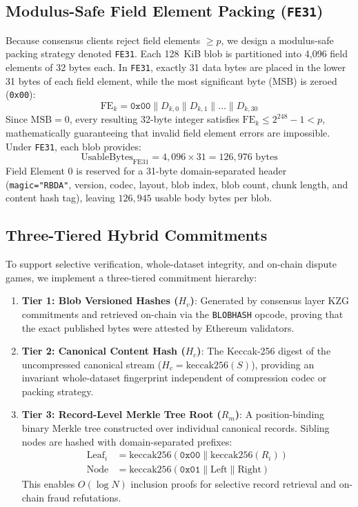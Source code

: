 \subsection{Modulus-Safe Field Element Packing (\texttt{FE31})}
Because consensus clients reject field elements $\ge p$, we design a modulus-safe packing strategy denoted \texttt{FE31}. Each 128~KiB blob is partitioned into 4,096 field elements of 32 bytes each. In \texttt{FE31}, exactly 31 data bytes are placed in the lower 31 bytes of each field element, while the most significant byte (MSB) is zeroed (\texttt{0x00}):
\begin{equation}
\text{FE}_k = \texttt{0x00} \parallel D_{k,0} \parallel D_{k,1} \parallel \dots \parallel D_{k,30}
\end{equation}
Since $\text{MSB} = 0$, every resulting 32-byte integer satisfies $\text{FE}_k \le 2^{248} - 1 < p$, mathematically guaranteeing that invalid field element errors are impossible. Under \texttt{FE31}, each blob provides:
\begin{equation}
\text{UsableBytes}_{\text{FE31}} = 4,096 \times 31 = 126,976 \text{ bytes}
\end{equation}
Field Element 0 is reserved for a 31-byte domain-separated header (\texttt{magic="RBDA"}, version, codec, layout, blob index, blob count, chunk length, and content hash tag), leaving $126,945$ usable body bytes per blob.

\subsection{Three-Tiered Hybrid Commitments}
To support selective verification, whole-dataset integrity, and on-chain dispute games, we implement a three-tiered commitment hierarchy:
\begin{enumerate}
    \item \textbf{Tier 1: Blob Versioned Hashes ($H_v$)}: Generated by consensus layer KZG commitments and retrieved on-chain via the \texttt{BLOBHASH} opcode, proving that the exact published bytes were attested by Ethereum validators.
    \item \textbf{Tier 2: Canonical Content Hash ($H_c$)}: The Keccak-256 digest of the uncompressed canonical stream ($H_c = \text{keccak256}(S)$), providing an invariant whole-dataset fingerprint independent of compression codec or packing strategy.
    \item \textbf{Tier 3: Record-Level Merkle Tree Root ($R_m$)}: A position-binding binary Merkle tree constructed over individual canonical records. Sibling nodes are hashed with domain-separated prefixes:
    \begin{align}
    \text{Leaf}_i &= \text{keccak256}(\texttt{0x00} \parallel \text{keccak256}(R_i)) \\
    \text{Node} &= \text{keccak256}(\texttt{0x01} \parallel \text{Left} \parallel \text{Right})
    \end{align}
    This enables $O(\log N)$ inclusion proofs for selective record retrieval and on-chain fraud refutations.
\end{enumerate}


